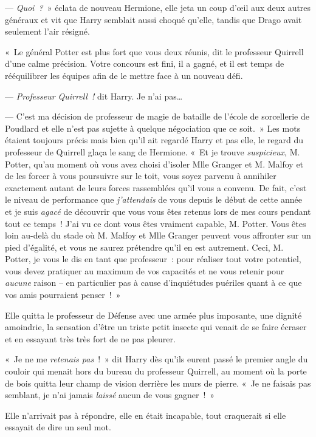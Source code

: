 --- \emph{Quoi~?}~» éclata de nouveau Hermione, elle jeta un coup d'œil aux deux autres généraux et vit que Harry semblait aussi choqué qu'elle, tandis que Drago avait seulement l'air résigné.

«~Le général Potter est plus fort que vous deux réunis, dit le professeur Quirrell d'une calme précision.
Votre concours est fini, il a gagné, et il est temps de rééquilibrer les équipes afin de le mettre face à un nouveau défi.

--- \emph{Professeur Quirrell~!} dit Harry.
Je n'ai pas…

--- C'est ma décision de professeur de magie de bataille de l'école de sorcellerie de Poudlard et elle n'est pas sujette à quelque négociation que ce soit.~»
Les mots étaient toujours précis mais bien qu'il ait regardé Harry et pas elle, le regard du professeur de Quirrell glaça le sang de Hermione.
«~Et je trouve \emph{suspicieux}, M. Potter, qu'au moment où vous avez choisi d'isoler Mlle Granger et M. Malfoy et de les forcer à vous poursuivre sur le toit, vous soyez parvenu à annihiler exactement autant de leurs forces rassemblées qu'il vous a convenu.
De fait, c'est le niveau de performance que \emph{j'attendais} de vous depuis le début de cette année et je suis \emph{agacé} de découvrir que vous vous êtes retenus lors de mes cours pendant tout ce temps~!
J'ai vu ce dont vous êtes vraiment capable, M. Potter.
Vous êtes loin au-delà du stade où M. Malfoy et Mlle Granger peuvent vous affronter sur un pied d'égalité, et vous ne saurez prétendre qu'il en est autrement.
Ceci, M. Potter, je vous le dis en tant que professeur~: pour réaliser tout votre potentiel, vous devez pratiquer au maximum de vos capacités et ne vous retenir pour \emph{aucune} raison -- en particulier pas à cause d'inquiétudes puériles quant à ce que vos amis pourraient penser~!~»

\later

Elle quitta le professeur de Défense avec une armée plus imposante, une dignité amoindrie, la sensation d'être un triste petit insecte qui venait de se faire écraser et en essayant très très fort de ne pas pleurer.

«~Je ne me \emph{retenais pas}~!~»
dit Harry dès qu'ils eurent passé le premier angle du couloir qui menait hors du bureau du professeur Quirrell, au moment où la porte de bois quitta leur champ de vision derrière les murs de pierre.
«~Je ne faisais pas semblant, je n'ai jamais \emph{laissé} aucun de vous gagner~!~»

Elle n'arrivait pas à répondre, elle en était incapable, tout craquerait si elle essayait de dire un seul mot.

